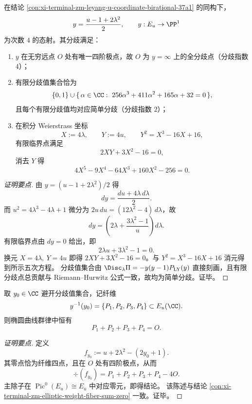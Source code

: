 \begin{conclusion}[分歧剖分与积分坐标下的临界五次方程]\label{con:xi-terminal-zm-leyang-u-coordinate-ramification-integral-quintic}
在结论 \ref{con:xi-terminal-zm-leyang-u-coordinate-birational-37a1} 的同构下，
\[
y=\frac{u-1+2\lambda^2}{2},\qquad y:E_u\to\PP^1
\]
为次数 \(4\) 的态射。其分歧满足：
\begin{enumerate}
  \item \(y\) 在无穷远点 \(O\) 处有唯一四阶极点，故 \(O\) 为 \(y=\infty\) 上的全分歧点（分歧指数 \(4\)）；
  \item 有限分歧值集合恰为
  \[
  \{0,1\}\cup\{\,\alpha\in\CC:\ 256\alpha^3+411\alpha^2+165\alpha+32=0\,\},
  \]
  且每个有限分歧值均对应简单分歧（分歧指数 \(2\)）；
  \item 在积分 Weierstrass 坐标
  \[
  X:=4\lambda,\qquad Y:=4u,\qquad Y^2=X^3-16X+16,
  \]
  有限临界点满足
  \[
  2XY+3X^2-16=0,
  \]
  消去 \(Y\) 得
  \[
  4X^5-9X^4-64X^3+160X^2-256=0.
  \]
\end{enumerate}
\end{conclusion}
\begin{proof}[证明要点]
由 \(y=(u-1+2\lambda^2)/2\) 得
\[
dy=\frac{du+4\lambda\,d\lambda}{2}.
\]
而 \(u^2=4\lambda^3-4\lambda+1\) 微分为 \(2u\,du=(12\lambda^2-4)\,d\lambda\)，故
\[
dy=\left(2\lambda+\frac{3\lambda^2-1}{u}\right)d\lambda.
\]
有限临界点由 \(dy=0\) 给出，即
\[
2\lambda u+3\lambda^2-1=0.
\]
换元 \(X=4\lambda,\ Y=4u\) 即得 \(2XY+3X^2-16=0\)。与 \(Y^2=X^3-16X+16\) 消元得到所示五次方程。
分歧值集合由 \(\Disc_\lambda\Pi=-y(y-1)P_{\mathrm{LY}}(y)\) 直接刻画，且有限分歧点总贡献与 Riemann--Hurwitz 公式一致，故均为简单分歧。证毕。
\end{proof}

\begin{conclusion}[非分歧纤维四点零和]\label{con:xi-terminal-zm-leyang-u-coordinate-fiber-fourpoint-zero-sum}
取 \(y_0\in\CC\) 避开分歧值集合，记纤维
\[
y^{-1}(y_0)=\{P_1,P_2,P_3,P_4\}\subset E_u(\CC).
\]
则椭圆曲线群律中恒有
\[
P_1+P_2+P_3+P_4=O.
\]
\end{conclusion}
\begin{proof}[证明要点]
定义
\[
f_{y_0}:=u+2\lambda^2-(2y_0+1).
\]
其零点恰为纤维四点，且在 \(O\) 处有四阶极点，从而
\[
\div(f_{y_0})=P_1+P_2+P_3+P_4-4O.
\]
主除子在 \(\operatorname{Pic}^0(E_u)\cong E_u\) 中对应零元，即得结论。
该陈述与结论 \ref{con:xi-terminal-zm-elliptic-weight-fiber-sum-zero} 一致。证毕。
\end{proof}

